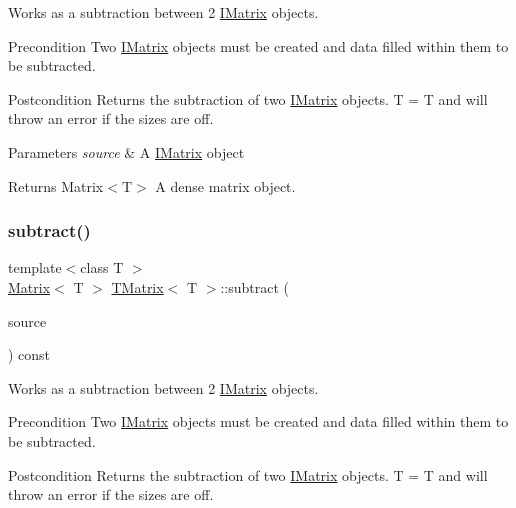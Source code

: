 Works as a subtraction between 2 \mbox{\hyperlink{class_i_matrix}{I\+Matrix}} objects. 

\begin{DoxyPrecond}{Precondition}
Two \mbox{\hyperlink{class_i_matrix}{I\+Matrix}} objects must be created and data filled within them to be subtracted. 
\end{DoxyPrecond}
\begin{DoxyPostcond}{Postcondition}
Returns the subtraction of two \mbox{\hyperlink{class_i_matrix}{I\+Matrix}} objects. T = T and will throw an error if the sizes are off.
\end{DoxyPostcond}

\begin{DoxyParams}{Parameters}
{\em source} & A \mbox{\hyperlink{class_i_matrix}{I\+Matrix}} object \\
\hline
\end{DoxyParams}
\begin{DoxyReturn}{Returns}
Matrix$<$\+T$>$ A dense matrix object. 
\end{DoxyReturn}
\mbox{\label{class_t_matrix_aec6418c61539221bb46bc104c6147b24}} 
\subsubsection{\texorpdfstring{subtract()}{subtract()}\hspace{0.1cm}{\footnotesize\ttfamily [6/6]}}
{\footnotesize\ttfamily template$<$class T $>$ \\
\mbox{\hyperlink{class_matrix}{Matrix}}$<$ T $>$ \mbox{\hyperlink{class_t_matrix}{T\+Matrix}}$<$ T $>$\+::subtract (\begin{DoxyParamCaption}\item[{const \mbox{\hyperlink{class_i_matrix}{I\+Matrix}}$<$ \mbox{\hyperlink{class_d_matrix}{D\+Matrix}}$<$ T $>$, T $>$ \&}]{source }\end{DoxyParamCaption}) const}



Works as a subtraction between 2 \mbox{\hyperlink{class_i_matrix}{I\+Matrix}} objects. 

\begin{DoxyPrecond}{Precondition}
Two \mbox{\hyperlink{class_i_matrix}{I\+Matrix}} objects must be created and data filled within them to be subtracted. 
\end{DoxyPrecond}
\begin{DoxyPostcond}{Postcondition}
Returns the subtraction of two \mbox{\hyperlink{class_i_matrix}{I\+Matrix}} objects. T = T and will throw an error if the sizes are off.
\end{DoxyPostcond}

